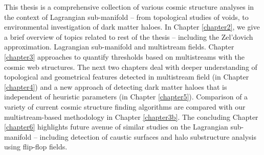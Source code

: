 This thesis is a comprehensive collection of various cosmic structure analyses in the context of Lagrangian sub-manifold -- from topological studies of voids, to environmental investigation of dark matter haloes. In Chapter \ref{chapter2}, we give a brief overview of topics related to rest of the thesis -- including the Zel'dovich approximation. Lagrangian sub-manifold and multistream fields. Chapter \ref{chapter3} approaches to quantify thresholds based on multistreams with the cosmic web structures. The next two chapters deal with deeper understanding of topological and geometrical features detected in multistream field (in Chapter \ref{chapter4}) and a new approach of detecting dark matter haloes that is independent of heuristic parameters (in Chapter \ref{chapter5}). Comparison of a variety of current cosmic structure finding algorithms are compared with our multistream-based methodology in Chapter \ref{chapter3b}. The concluding Chapter \ref{chapter6} highlights future avenue of similar studies on the Lagrangian sub-manifold -- including detection of caustic surfaces and halo substructure analysis using flip-flop fields. 





